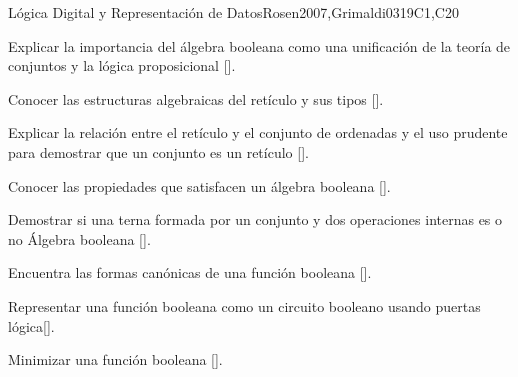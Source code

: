 \begin{syllabus}
\begin{unit}{Lógica Digital y Representación de Datos}{}{Rosen2007,Grimaldi03}{19}{C1,C20}
   \begin{learningoutcomes}
	\item Explicar la importancia del álgebra booleana como una unificación de la teoría de conjuntos y la lógica proposicional [\Assessment].
	\item Conocer las estructuras algebraicas del retículo y sus tipos [\Assessment].
	\item Explicar la relación entre el retículo y el conjunto de ordenadas y el uso prudente para demostrar que un conjunto es un retículo [\Assessment].
	\item Conocer las propiedades que satisfacen un álgebra booleana [\Assessment].
	\item Demostrar si una terna formada por un conjunto y dos operaciones internas es o no Álgebra booleana [\Assessment].
	\item Encuentra las formas canónicas de una función booleana  [\Assessment].
	\item Representar una función booleana como un circuito booleano usando puertas lógica[\Assessment].
	\item Minimizar una función booleana [\Assessment].
    \end{learningoutcomes}
\end{unit}



\begin{coursebibliography}
\end{coursebibliography}

\end{syllabus}

%
